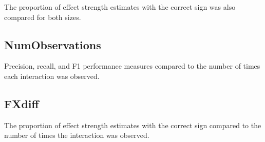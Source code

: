 The proportion of effect strength estimates with the correct sign was also compared for both sizes.

\subsection{NumObservations}
Precision, recall, and F1 performance measures compared to the number of times each interaction was observed.

\subsection{FXdiff}
The proportion of effect strength estimates with the correct sign compared to the number of times the interaction was observed.




